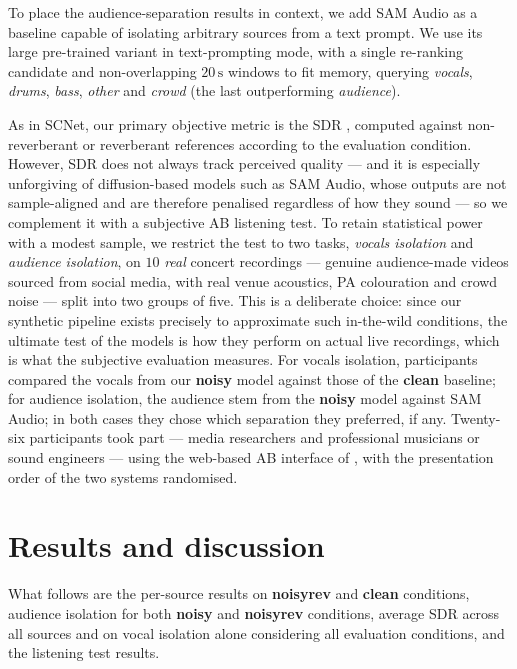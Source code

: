 To place the audience-separation results in context, we add SAM Audio
\citep{shi2025samaudio} as a baseline capable of isolating arbitrary sources
from a text prompt. We use its large pre-trained variant in text-prompting mode,
with a single re-ranking candidate and non-overlapping $20\,\text{s}$ windows to
fit memory, querying \emph{vocals}, \emph{drums}, \emph{bass}, \emph{other} and
\emph{crowd} (the last outperforming \emph{audience}).

As in SCNet, our primary objective metric is the \acrfull{SDR} \citep{le2019sdr},
computed against non-reverberant or reverberant references according to the
evaluation condition. However, \acrshort{SDR} does not always track perceived
quality \citep{guso2022loss, jaffe2025musical} --- and it is especially
unforgiving of diffusion-based models such as SAM Audio, whose outputs are not
sample-aligned and are therefore penalised regardless of how they sound --- so we
complement it with a subjective AB listening test. To retain statistical power
with a modest sample, we restrict the test to two tasks, \emph{vocals isolation}
and \emph{audience isolation}, on $10$ \emph{real} concert recordings --- genuine audience-made videos sourced
from social media, with real venue acoustics, \acrshort{PA}
colouration and crowd noise --- split into two groups of five. This is a
deliberate choice: since our synthetic pipeline exists precisely to approximate
such in-the-wild conditions, the ultimate test of the models is how they perform
on actual live recordings, which is what the subjective evaluation measures. For vocals isolation,
participants compared the vocals from our \textbf{noisy} model against those of
the \textbf{clean} baseline; for audience isolation, the audience stem from the
\textbf{noisy} model against SAM Audio; in both cases they chose which
separation they preferred, if any. Twenty-six participants took part --- media
researchers and professional musicians or sound engineers --- using the web-based
AB interface of \citet{zhang_barry_sun_hines_2021}, with the presentation order
of the two systems randomised.


\section{Results and discussion}
\label{sec:mss_results}
What follows are the per-source results on  \textbf{noisyrev} and  \textbf{clean} conditions, audience isolation for both \textbf{noisy} and \textbf{noisyrev} conditions, average \acrshort{SDR} across all sources and on vocal isolation alone considering all evaluation conditions, and the listening test results.

